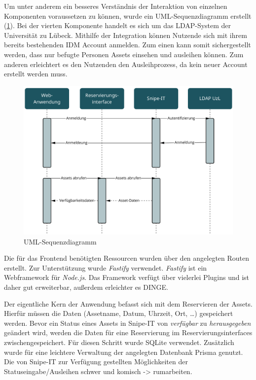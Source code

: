 Um unter anderem ein besseres Verständnis der Interaktion von einzelnen
Komponenten voraussetzen zu können, wurde ein UML-Sequenzdiagramm erstellt
(\ref{fig:uml}). Bei der vierten Komponente handelt es sich um das LDAP-System
der Universität zu Lübeck. Mithilfe der Integration können Nutzende sich mit
ihrem bereits bestehenden IDM Account anmelden. Zum einen kann somit
sichergestellt werden, dass nur befugte Personen Assets einsehen und ausleihen
können. Zum anderen erleichtert es den Nutzenden den Ausleihprozess, da kein
neuer Account erstellt werden muss.

\begin{figure}[h]
  \centering
  \includegraphics[scale=0.45]{Bilder/uml.pdf}
  \caption[UML-Sequenzdiagramm]{UML-Sequenzdiagramm}
  \label{fig:uml}
\end{figure}

Die für das Frontend benötigten Ressourcen wurden über den angelegten Routen
erstellt. Zur Unterstützung wurde \textit{Fastify} verwendet. \textit{Fastify}
ist ein Webframework für \textit{Node.js}. Das Framework verfügt über vielerlei
Plugins und ist daher gut erweiterbar, außerdem erleichter es DINGE.

Der eigentliche Kern der Anwendung befasst sich mit dem Reservieren der Assets.
Hierfür müssen die Daten (Assetname, Datum, Uhrzeit, Ort, \dots) gespeichert
werden. Bevor ein Status eines Assets in Snipe-IT von \textit{verfügbar} zu
\textit{herausgegeben} geändert wird, werden die Daten für eine Reservierung im
Reservierungsinterfaces zwischengespeichert. Für diesen Schritt wurde SQLite
verwendet. Zusätzlich wurde für eine leichtere Verwaltung der angelegten
Datenbank Prisma genutzt. Die von Snipe-IT zur Verfügung gestellten
Möglichkeiten der Statuseingabe/Ausleihen schwer und komisch -> rumarbeiten.

